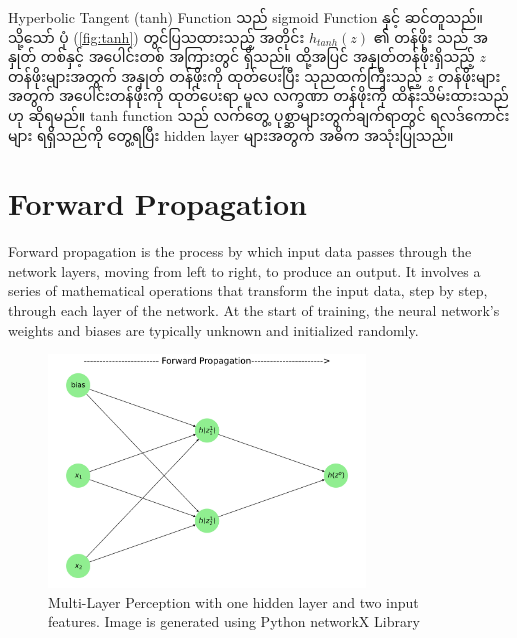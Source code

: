 Hyperbolic Tangent (tanh) Function သည် sigmoid Function နှင့် ဆင်တူသည်။ သို့သော် ပုံ (\ref{fig:tanh}) တွင်ပြသထားသည့် အတိုင်း $h_{tanh}(z)$ ၏ တန်ဖိုး သည် အနှုတ် တစ်နှင့် အပေါင်းတစ် အကြားတွင် ရှိသည်။ ထို့အပြင် အနှုတ်တန်ဖိုးရှိသည့် $z$ တန်ဖိုးများအတွက် အနှုတ် တန်ဖိုးကို ထုတ်ပေးပြီး သုညထက်ကြီးသည့် $z$ တန်ဖိုးများအတွက် အပေါင်းတန်ဖိုးကို ထုတ်ပေးရာ မူလ လက္ခဏာ တန်ဖိုးကို ထိန်းသိမ်းထားသည်ဟု ဆိုရမည်။ 
tanh function သည် လက်တွေ့ ပုစ္ဆာများတွက်ချက်ရာတွင် ရလဒ်ကောင်းများ ရရှိသည်ကို တွေ့ရပြီး hidden layer များအတွက် အဓိက အသုံးပြုသည်။

\newpage
\section{Forward Propagation}\label{sec:FProp}
Forward propagation is the process by which input data passes through the network layers, moving from left to right, to produce an output. It involves a series of mathematical operations that transform the input data, step by step, through each layer of the network. At the start of training, the neural network's weights and biases are typically unknown and initialized randomly.

\vspace{1.5em} 

\begin{figure}[h]%
\centering
\includegraphics[width=0.75\textwidth]{imgs/fw_eg.png}
\caption{Multi-Layer Perception with one hidden layer and two input features. Image is generated using Python networkX Library}\label{fig:mlp_fwprop}
\end{figure}

